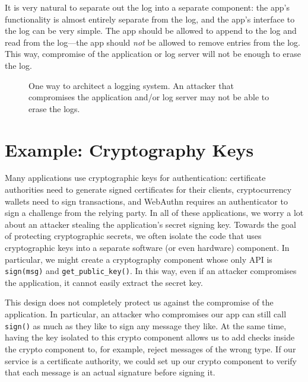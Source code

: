 \documentclass[
  letterpaper,
]{scrbook}
\theoremstyle{definition}
\theoremstyle{plain}
\theoremstyle{plain}
\theoremstyle{remark}
\begin{document}
It is very natural to separate out the log into a separate component:
the app's functionality is almost entirely separate from the log, and
the app's interface to the log can be very simple. The app should be
allowed to append to the log and read from the log---the app should
\emph{not} be allowed to remove entries from the log. This way,
compromise of the application or log server will not be enough to erase
the log.

\begin{figure}


\caption{\label{fig-logging}One way to architect a logging system. An
attacker that compromises the application and/or log server may not be
able to erase the logs.}

\end{figure}%

\section{Example: Cryptography Keys}\label{example-cryptography-keys}

Many applications use cryptographic keys for authentication: certificate
authorities need to generate signed certificates for their clients,
cryptocurrency wallets need to sign transactions, and WebAuthn requires
an authenticator to sign a challenge from the relying party. In all of
these applications, we worry a lot about an attacker stealing the
application's secret signing key. Towards the goal of protecting
cryptographic secrets, we often isolate the code that uses cryptographic
keys into a separate software (or even hardware) component. In
particular, we might create a cryptography component whose only API is
\texttt{sign(msg)} and \texttt{get\_public\_key()}. In this way, even if
an attacker compromises the application, it cannot easily extract the
secret key.

This design does not completely protect us against the compromise of the
application. In particular, an attacker who compromises our app can
still call \texttt{sign()} as much as they like to sign any message they
like. At the same time, having the key isolated to this crypto component
allows us to add checks inside the crypto component to, for example,
reject messages of the wrong type. If our service is a certificate
authority, we could set up our crypto component to verify that each
message is an actual signature before signing it.
\end{document}
